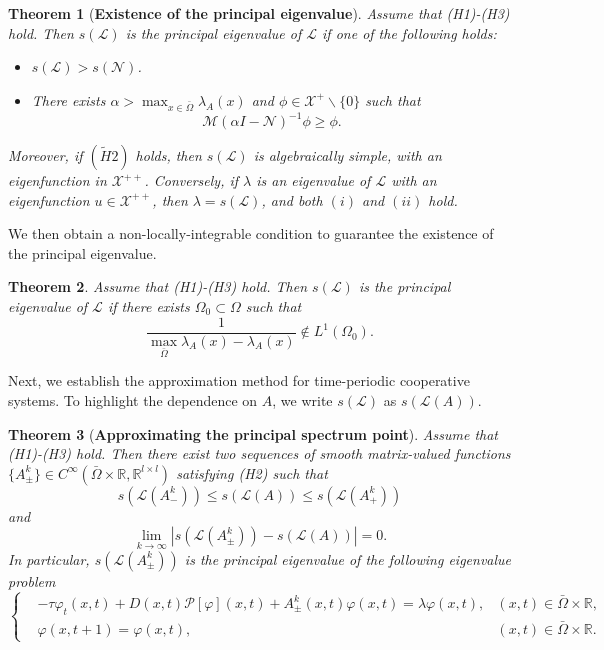 \documentclass[11pt,reqno]{amsart}
\newtheorem{theorem}{Theorem}[section]
\numberwithin{equation}{section}
\begin{document}
\begin{theorem}[\textbf{Existence of the principal eigenvalue}]\label{THM1.3}
Assume that (H1)-(H3) hold. Then
$s(\mathcal{L})$ is the principal eigenvalue of $\mathcal{L}$ if one of the following holds:
\begin{itemize}[leftmargin=0.9cm]
\item[(i)] $s(\mathcal{L})>s(\mathcal{N})$.
\item[(ii)] There exists $\alpha > \max_{x\in\bar{\Omega}} \lambda_{A}(x)$ and $\phi\in\mathcal{X}^{+}\backslash \{0\}$ such that
$$
\mathcal{M}(\alpha I - \mathcal{N})^{-1}\phi \geq \phi.
$$
\end{itemize}
Moreover, if $(\tilde{H}2)$ holds, then $s(\mathcal{L})$ is algebraically simple, with an eigenfunction in $\mathcal{X}^{++}$.
Conversely, if $\lambda$ is an eigenvalue of $\mathcal{L}$ with an eigenfunction $u \in \mathcal{X}^{++}$, then $\lambda=s(\mathcal{L})$, and both $(i)$ and $(ii)$ hold.
\end{theorem}
We then obtain a non-locally-integrable condition to guarantee the existence of the principal eigenvalue.
\begin{theorem}\label{THM1.4}
Assume that (H1)-(H3) hold. Then
$s(\mathcal{L})$ is the principal eigenvalue of $\mathcal{L}$ if
there exists $\Omega_{0}\subset\Omega$ such that
\begin{equation*}
\frac{1}{ \max_{\bar{\Omega}}\lambda_{A}(x)- \lambda_{A}(x)}\not\in L^{1}(\Omega_{0}).
\end{equation*}
\end{theorem}
%
%
Next, we establish the approximation method for time-periodic cooperative systems.
To highlight the dependence on $A$, we write $s(\mathcal{L})$ as $s(\mathcal{L}(A))$.
%
%
\begin{theorem}[\textbf{Approximating the principal spectrum point}]\label{THM1.5}
Assume that (H1)-(H3) hold. Then there exist two sequences of smooth matrix-valued functions $\{A^{k}_{{\pm}}\}\in C^{\infty}(\bar{\Omega}\times\mathbb{R},\mathbb{R}^{l\times l})$  satisfying (H2) such that
\begin{equation*}
s(\mathcal{L}(A^{k}_{-}))
\leq
s(\mathcal{L}(A))
\leq s(\mathcal{L}(A^{k}_{+}))
\end{equation*}
and
\begin{equation*}
\lim_{k\to\infty} \left| s(\mathcal{L}(A_{\pm}^{k})) - s(\mathcal{L}(A)) \right|=0.
\end{equation*}
In particular, $s(\mathcal{L}(A_{\pm}^{k}))$ is the principal eigenvalue of the following eigenvalue problem
\begin{equation*}
\left\{
\begin{aligned}
& -\tau\varphi_{t}(x,t)+D(x,t)\mathcal{P}[\varphi](x,t)+ A^{k}_{\pm}(x,t)\varphi(x,t)  =  \lambda \varphi(x,t), & (x,t) \in \bar{\Omega} \times \mathbb{R}, \\
&\varphi(x,t+1) = \varphi(x,t), & (x,t) \in \bar{\Omega} \times \mathbb{R}.
\end{aligned}
	\right.
\end{equation*}
\end{theorem}
\end{document}
